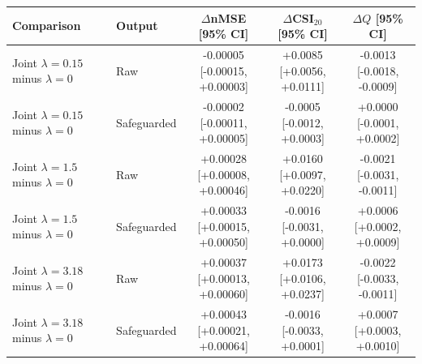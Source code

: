 \begin{tabular}{llccc}
\hline
Comparison & Output & $\Delta$nMSE [95\% CI] & $\Delta$CSI$_{20}$ [95\% CI] & $\Delta Q$ [95\% CI] \\
\hline
\shortstack[l]{Joint $\lambda=0.15$\\minus $\lambda=0$} & Raw & \shortstack{-0.00005\\{[-0.00015, +0.00003]}} & \shortstack{+0.0085\\{[+0.0056, +0.0111]}} & \shortstack{-0.0013\\{[-0.0018, -0.0009]}} \\
\shortstack[l]{Joint $\lambda=0.15$\\minus $\lambda=0$} & Safeguarded & \shortstack{-0.00002\\{[-0.00011, +0.00005]}} & \shortstack{-0.0005\\{[-0.0012, +0.0003]}} & \shortstack{+0.0000\\{[-0.0001, +0.0002]}} \\
\shortstack[l]{Joint $\lambda=1.5$\\minus $\lambda=0$} & Raw & \shortstack{+0.00028\\{[+0.00008, +0.00046]}} & \shortstack{+0.0160\\{[+0.0097, +0.0220]}} & \shortstack{-0.0021\\{[-0.0031, -0.0011]}} \\
\shortstack[l]{Joint $\lambda=1.5$\\minus $\lambda=0$} & Safeguarded & \shortstack{+0.00033\\{[+0.00015, +0.00050]}} & \shortstack{-0.0016\\{[-0.0031, +0.0000]}} & \shortstack{+0.0006\\{[+0.0002, +0.0009]}} \\
\shortstack[l]{Joint $\lambda=3.18$\\minus $\lambda=0$} & Raw & \shortstack{+0.00037\\{[+0.00013, +0.00060]}} & \shortstack{+0.0173\\{[+0.0106, +0.0237]}} & \shortstack{-0.0022\\{[-0.0033, -0.0011]}} \\
\shortstack[l]{Joint $\lambda=3.18$\\minus $\lambda=0$} & Safeguarded & \shortstack{+0.00043\\{[+0.00021, +0.00064]}} & \shortstack{-0.0016\\{[-0.0033, +0.0001]}} & \shortstack{+0.0007\\{[+0.0003, +0.0010]}} \\[5pt]

\end{tabular}
